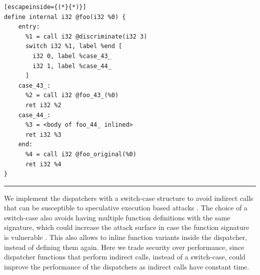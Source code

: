 \begin{code}
\scriptsize
\noindent\begin{minipage}[b]{\linewidth}
    \begin{minipage}[t]{1\linewidth}
        \begin{lstlisting}[escapeinside={(*}{*)}]
define internal i32 @foo(i32 %0) {
    entry:
      %1 = call i32 @discriminate(i32 3)
      switch i32 %1, label %end [
        i32 0, label %case_43_
        i32 1, label %case_44_
      ]
    case_43_:                 
      %2 = call i32 @foo_43_(%0)
      ret i32 %2
    case_44_:                
      %3 = <body of foo_44_ inlined>
      ret i32 %3
    end:                                             
      %4 = call i32 @foo_original(%0)
      ret i32 %4
}
        \end{lstlisting}
    \end{minipage}%
    
    \noindent\rule{\linewidth}{0.4pt}
    \label{listing:multivariant_template}
\end{minipage}
\end{code}

We implement the dispatchers with a switch-case structure to avoid indirect calls that can be susceptible to speculative execution based attacks \cite{Narayan2021Swivel}. 
The choice of a switch-case also avoids having multiple function definitions with the same signature, which could increase the attack surface in case the function signature is vulnerable \cite{johnson2021}.
This also allows \tool to inline function variants inside the dispatcher, instead of defining them again.
Here we trade security over performance, since dispatcher functions  that perform indirect calls, instead of a switch-case,  could improve the performance  of the dispatchers as indirect calls have constant time.

